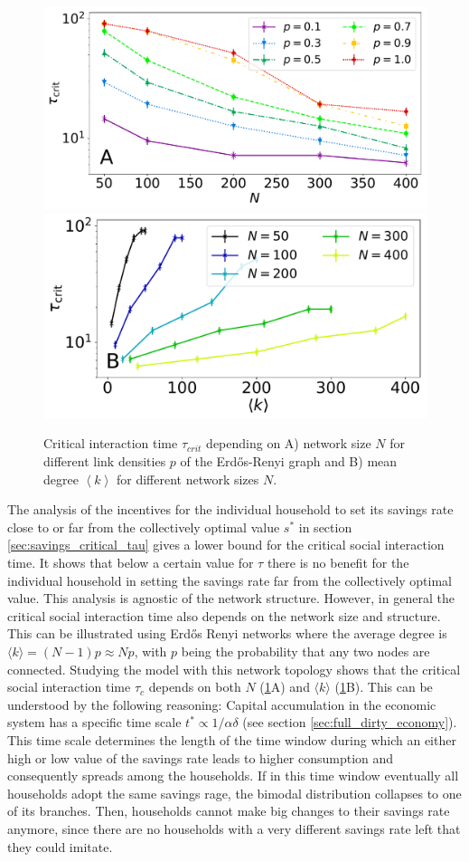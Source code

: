 \begin{figure}
  \centering
  \includegraphics[width = .6 \textwidth]{figures/taucrit_N2.pdf}
  \includegraphics[width = .6 \textwidth]{figures/taucrit_N_k.pdf}
\caption[Critical interaction time depending on network size and mean degree]{Critical interaction time $\tau_{crit}$ depending on A) network size $N$ for different link densities $p$ of the Erd\H{o}s-Renyi graph and B) mean degree $\left< k \right>$ for different network sizes $N$.}
  \label{fig:taucrit}
\end{figure}
The analysis of the incentives for the individual household to set its savings rate close to or far from the collectively optimal value $s^*$ in section \ref{sec:savings_critical_tau} gives a lower bound for the critical social interaction time. It shows that below a certain value for $\tau$ there is no benefit for the individual household in setting the savings rate far from the collectively optimal value. 
This analysis is agnostic of the network structure. However, in general the critical social interaction time also depends on the network size and structure. 
This can be illustrated using Erd\H{o}s Renyi networks where the average degree is $\langle k \rangle = (N-1)p \approx Np$, with $p$ being the probability that any two nodes are connected. Studying the model with this network topology shows that the critical social interaction time $\tau_{c}$ depends on both $N$ (\cref{fig:taucrit}A) and $\langle k \rangle$ (\cref{fig:taucrit}B). 
This can be understood by the following reasoning: Capital accumulation in the economic system has a specific time scale $t^* \propto 1/\alpha\delta$ (see section \ref{sec:full_dirty_economy}). This time scale determines the length of the time window during which an either high or low value of the savings rate leads to higher consumption and consequently spreads among the households. If in this time window eventually all households adopt the same savings rage, the bimodal distribution collapses to one of its branches. Then, households cannot make big changes to their savings rate anymore, since there are no households with a very different savings rate left that they could imitate.

